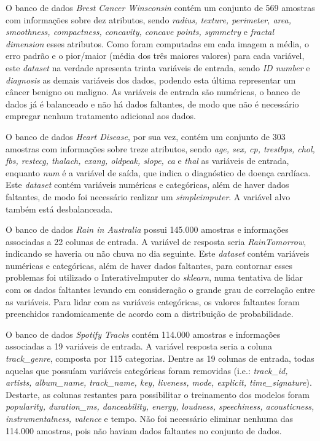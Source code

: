 \documentclass[journal]{IEEEtran}
\begin{document}
O banco de dados \textit{Brest Cancer Winsconsin} contém um conjunto de 569 amostras com informações sobre dez atributos, sendo \textit{radius, texture, perimeter, area, smoothness, compactness, concavity, concave points, symmetry} e \textit{fractal dimension} esses atributos. Como foram computadas em cada imagem a média, o erro padrão e o pior/maior (média dos três maiores valores) para cada variável, este \textit{dataset} na verdade apresenta trinta variáveis de entrada, sendo \textit{ID number} e \textit{diagnosis} as demais variáveis dos dados, podendo esta última representar um câncer benigno ou maligno. As variáveis de entrada são numéricas, o banco de dados já é balanceado e não há dados faltantes, de modo que não é necessário empregar nenhum tratamento adicional aos dados.

O banco de dados \textit{Heart Disease}, por sua vez, contém um conjunto de 303 amostras com informações sobre treze atributos, sendo \textit{age, sex, cp, trestbps, chol, fbs, restecg, thalach, exang, oldpeak, slope, ca} e \textit{thal} as variáveis de entrada, enquanto \textit{num} é a variável de saída, que indica o diagnóstico de doença cardíaca. Este \textit{dataset} contém variáveis numéricas e categóricas, além de haver dados faltantes, de modo foi necessário realizar um \textit{simpleimputer}. A variável alvo também está desbalanceada.

O banco de dados \textit{Rain in Australia} possui 145.000 amostras e informações associadas a 22 colunas de entrada. A variável de resposta seria \textit{RainTomorrow}, indicando se haveria ou não chuva no dia seguinte. Este \textit{dataset} contém variáveis numéricas e categóricas, além de haver dados faltantes, para contornar esses problemas foi utilizado o InterativeImputer do \textit{sklearn}, numa tentativa de lidar com os dados faltantes levando em consideração o grande grau de correlação entre as variáveis. Para lidar com as variáveis categóricas, os valores faltantes foram preenchidos randomicamente de acordo com a distribuição de probabilidade.

O banco de dados \textit{Spotify Tracks} contém 114.000 amostras e informações associadas a 19 variáveis de entrada. A variável resposta seria a coluna \textit{track\_genre}, composta por 115 categorias. Dentre as 19 colunas de entrada, todas aquelas que possuíam variáveis categóricas foram removidas (i.e.: \textit{track\_id, artists, album\_name, track\_name, key, liveness, mode, explicit, time\_signature}). Destarte, as colunas restantes para possibilitar o treinamento dos modelos foram \textit{popularity, duration\_ms, danceability, energy, loudness, speechiness, acousticness, instrumentalness, valence} e tempo. Não foi necessário eliminar nenhuma das 114.000 amostras, pois não haviam dados faltantes no conjunto de dados.
\end{document}
